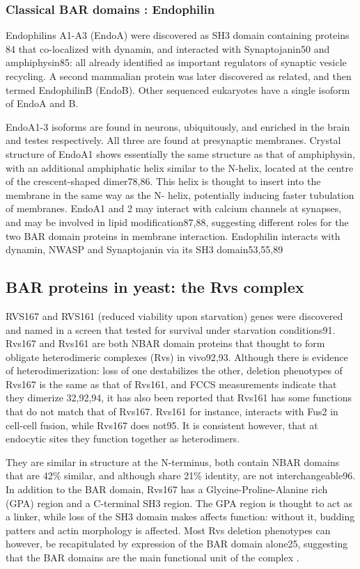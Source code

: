		\subsubsection{Classical BAR domains : Endophilin}
		Endophilins A1-A3 (EndoA) were discovered as SH3 domain containing proteins 84 that co-localized with dynamin, and interacted with Synaptojanin50 and amphiphysin85: all already identified as important regulators of synaptic vesicle recycling. A second mammalian protein was later discovered as related, and then termed EndophilinB (EndoB). Other sequenced eukaryotes have a single isoform of EndoA and B.

		\vspace{5mm}
		EndoA1-3 isoforms are found in neurons, ubiquitously, and enriched in the brain and testes respectively. All three are found at presynaptic membranes. Crystal structure of EndoA1 shows essentially the same structure as that of amphiphysin, with an additional amphiphatic helix similar to the N-helix, located at the centre of the crescent-shaped dimer78,86. This helix is thought to insert into the membrane in the same way as the N- helix, potentially inducing faster tubulation of membranes. EndoA1 and 2 may interact with calcium channels at synapses, and may be involved in lipid modification87,88, suggesting different roles for the two BAR domain proteins in membrane interaction. Endophilin interacts with dynamin, NWASP and Synaptojanin via its SH3 domain53,55,89


		\subsection{BAR proteins in yeast: the Rvs complex}		
		RVS167 and RVS161 (reduced viability upon starvation) genes were discovered and named in a screen that tested for survival under starvation conditions91. Rvs167 and Rvs161 are both NBAR domain proteins that thought to form obligate heterodimeric complexes (Rvs) in vivo92,93. Although there is evidence of heterodimerization: loss of one destabilizes the other, deletion phenotypes of Rvs167 is the same as that of Rvs161, and FCCS measurements indicate that they dimerize 32,92,94, it has also been reported that Rvs161 has some functions that do not match that of Rvs167. Rvs161 for instance, interacts with Fus2 in cell-cell fusion, while Rvs167 does not95. It is consistent however, that at endocytic sites they function together as heterodimers. 
		
		\vspace{5mm}
		They are similar in structure at the N-terminus, both contain NBAR domains that are 42\% similar, and although share 21\% identity, are not interchangeable96. In addition to the BAR domain, Rvs167 has a Glycine-Proline-Alanine rich (GPA) region and a C-terminal SH3 region. The GPA region is thought to act as a linker, while loss of the SH3 domain makes affects function: without it, budding patters and actin morphology is affected. Most Rvs deletion phenotypes can however, be recapitulated by expression of the BAR domain alone25, suggesting that the BAR domains are the main functional unit of the complex .
		
